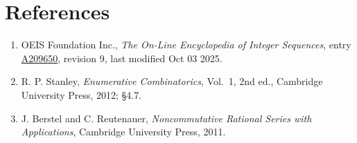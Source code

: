 \documentclass[11pt]{article}
\theoremstyle{definition}
\begin{document}
\section{References}

\begin{enumerate}

\item OEIS Foundation Inc., \emph{The On-Line Encyclopedia of Integer Sequences}, entry \href{https://oeis.org/A209650}{A209650}, revision 9, last modified Oct 03 2025.

\item R. P. Stanley, \emph{Enumerative Combinatorics}, Vol.~1, 2nd ed., Cambridge University Press, 2012; \S4.7.

\item J. Berstel and C. Reutenauer, \emph{Noncommutative Rational Series with Applications}, Cambridge University Press, 2011.

\end{enumerate}
\end{document}
